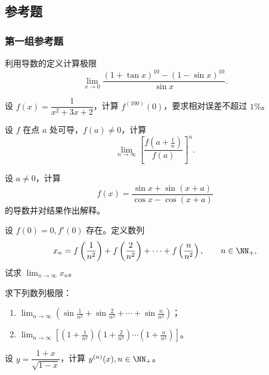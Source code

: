 \subsection{参考题}

\subsubsection*{第一组参考题}

\begin{xreferenceproblem}[1]
利用导数的定义计算极限
  \[
    \lim_{x\to0}\frac{(1+\tan x)^{10}-(1-\sin x)^{10}}{\sin x}.
  \]
\end{xreferenceproblem}

\begin{xreferenceproblem}[2]
设 $f(x)=\dfrac1{x^2+3x+2}$，计算 $f^{(100)}(0)$，要求相对误差不超过 $1\%$。
\end{xreferenceproblem}

\begin{xreferenceproblem}[3]
设 $f$ 在点 $a$ 处可导，$f(a)\ne0$，计算
  \[
    \lim_{n\to\infty}\left[\frac{f\left(a+\frac1n\right)}{f(a)}\right]^n.
  \]
\end{xreferenceproblem}

\begin{xreferenceproblem}[4]
设 $a\ne0$，计算
  \[
    f(x)=\frac{\sin x+\sin(x+a)}{\cos x-\cos(x+a)}
  \]
  的导数并对结果作出解释。
\end{xreferenceproblem}

\begin{xreferenceproblem}[5]
设 $f(0)=0,f'(0)$ 存在。定义数列
  \[
    x_n=f\left(\frac1{n^2}\right)+f\left(\frac2{n^2}\right)+\cdots+f\left(\frac n{n^2}\right),\qquad n\in\NN_+,
  \]
  试求 $\lim_{n\to\infty}x_n$。
\end{xreferenceproblem}

\begin{xreferenceproblem}[6]
求下列数列极限：
  \begin{enumerate}[label=(\arabic*)]
    \item $\displaystyle\lim_{n\to\infty}\left(\sin\frac1{n^2}+\sin\frac2{n^2}+\cdots+\sin\frac n{n^2}\right)$；
    \item $\displaystyle\lim_{n\to\infty}\left[\left(1+\frac1{n^2}\right)\left(1+\frac2{n^2}\right)\cdots\left(1+\frac n{n^2}\right)\right]$。
  \end{enumerate}
\end{xreferenceproblem}

\begin{xreferenceproblem}[7]
设 $y=\dfrac{1+x}{\sqrt{1-x}}$，计算 $y^{(n)}(x),n\in\NN_+$。
\end{xreferenceproblem}

